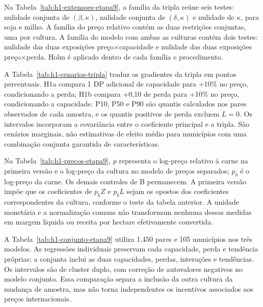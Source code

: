 Na Tabela~\ref{tab:h1-extensoes-etapa9}, a família da tripla reúne seis testes: nulidade conjunta de $(\beta,\kappa)$, nulidade conjunta de $(\delta,\kappa)$ e nulidade de $\kappa$, para soja e milho. A família do preço relativo contém as duas restrições conjuntas, uma por cultura. A família do modelo com ambas as culturas contém dois testes: nulidade das duas exposições preço×capacidade e nulidade das duas exposições preço×perda. Holm é aplicado dentro de cada família e procedimento.


\FloatBarrier

A Tabela~\ref{tab:h1-cenarios-tripla} traduz os gradientes da tripla em pontos percentuais. H1a compara 1 DP adicional de capacidade para +10\% no preço, condicionando a perda; H1b compara +0,10 de perda para +10\% no preço, condicionando a capacidade. P10, P50 e P90 são quantis calculados nos pares observados de cada amostra, e os quantis positivos de perda excluem $L=0$. Os intervalos incorporam a covariância entre o coeficiente principal e a tripla. São cenários marginais, não estimativas de efeito médio para municípios com uma combinação conjunta garantida de características.


\FloatBarrier

Na Tabela~\ref{tab:h1-precos-etapa9}, $p$ representa o log-preço relativo à carne na primeira versão e o log-preço da cultura no modelo de preços separados; $p_b$ é o log-preço da carne. Os demais controles de B permanecem. A primeira versão impõe que os coeficientes de $p_bZ$ e $p_bL$ sejam os opostos dos coeficientes correspondentes da cultura, conforme o teste da tabela anterior. A unidade monetária e a normalização comuns não transformam nenhuma dessas medidas em margem líquida ou receita por hectare efetivamente convertida.


\FloatBarrier

A Tabela~\ref{tab:h1-conjunto-etapa9} utiliza 1.450 pares e 105 municípios nos três modelos. As regressões individuais preservam cada capacidade, perda e tendência próprias; a conjunta inclui as duas capacidades, perdas, interações e tendências. Os intervalos são de cluster duplo, com correção de autovalores negativos no modelo conjunto. Essa comparação separa a inclusão da outra cultura da mudança de amostra, mas não torna independentes os incentivos associados aos preços internacionais.


\FloatBarrier

